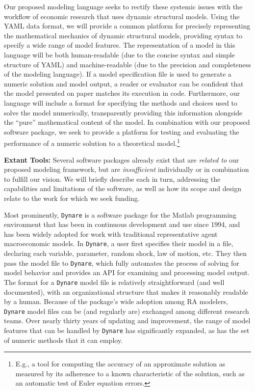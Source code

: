 \documentclass[12pt,pdftex,letterpaper]{article}
\begin{document}
Our proposed modeling language seeks to rectify these systemic issues with the workflow of economic research that uses dynamic structural models. Using the YAML data format, we will provide a common platform for precisely representing the mathematical mechanics of dynamic structural models, providing syntax to specify a wide range of model features. The representation of a model in this language will be both human-readable (due to the concise syntax and simple structure of YAML) and machine-readable (due to the precision and completeness of the modeling language). If a model specification file is used to generate a numeric solution and model output, a reader or evaluator can be confident that the model presented on paper matches its execution in code. Furthermore, our language will include a format for specifying the methods and choices used to solve the model numerically, transparently providing this information alongside the ``pure'' mathematical content of the model. In combination with our proposed software package, we seek to provide a platform for testing and evaluating the performance of a numeric solution to a theoretical model.\footnote{E.g., a tool for computing the accuracy of an approximate solution as measured by its adherence to a known characteristic of the solution, such as an automatic test of Euler equation errors.}

\vspace{0.5cm}

\noindent \textbf{Extant Tools:} Several software packages already exist that are \textit{related to} our proposed modeling framework, but are \textit{insufficient} individually or in combination to fulfill our vision. We will briefly describe each in turn, addressing the capabilities and limitations of the software, as well as how its scope and design relate to the work for which we seek funding.

Most prominently, \texttt{Dynare} is a software package for the Matlab programming environment that has been in continuous development and use since 1994, and has been widely adopted for work with traditional representative agent macroeconomic models. In \texttt{Dynare}, a user first specifies their model in a file, declaring each variable, parameter, random shock, law of motion, etc. They then pass the model file to \texttt{Dynare}, which fully automates the process of solving for model behavior and provides an API for examining and processing model output. The format for a \texttt{Dynare} model file is relatively straightforward (and well documented), with an organizational structure that makes it reasonably readable by a human. Because of the package's wide adoption among RA modelers, \texttt{Dynare} model files can be (and regularly are) exchanged among different research teams. Over nearly thirty years of updating and improvement, the range of model features that can be handled by \texttt{Dynare} has significantly expanded, as has the set of numeric methods that it can employ.
\end{document}
